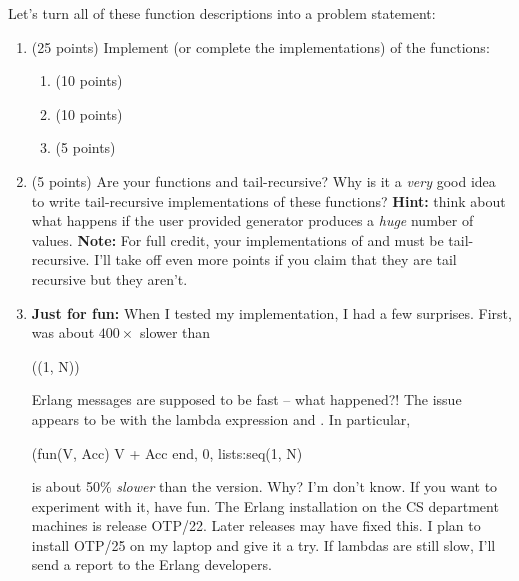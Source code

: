 \documentclass{article}
\begin{document}
\begin{enumerate}
    Let's turn all of these function descriptions into a problem statement:
    \begin{enumerate}
      \item (25 points) Implement (or complete the implementations) of the functions:
	\begin{enumerate}
	  \item {}  (10 points)
	  \item {}  (10 points)
	  \item {}  (5 points)
	\end{enumerate}
      \item (5 points) Are your functions  and  tail-recursive?
	Why is it a \emph{very} good idea to write tail-recursive implementations of these functions?
	\textbf{Hint:} think about what happens if the user provided generator produces a \emph{huge} number of
	values.
	\textbf{Note:} For full credit, your implementations of  and 
	must be tail-recursive.  I'll take off even more points if you claim that they are tail recursive but they aren't.
      \item \textbf{Just for fun:}  When I tested my implementation, I had a few surprises.
	First,  was about $400\times$ slower than
	\begin{xcode}
	  ((1, N))
	\end{xcode}
	Erlang messages are supposed to be fast -- what happened?!
	The issue appears to be with the lambda expression  and
	.  In particular,
	\begin{xcode}
	  (fun(V, Acc) V + Acc end, 0, lists:seq(1, N)
	\end{xcode}
	is about 50\% \emph{slower} than the  version.
	Why?  I'm don't know.  If you want to experiment with it, have fun.
	The Erlang installation on the CS department machines is release OTP/22.
	Later releases may have fixed this.  I plan to install OTP/25 on my laptop and give it a try.
	If lambdas are still slow, I'll send a report to the Erlang developers.
    \end{enumerate}
\end{enumerate}
\end{document}
